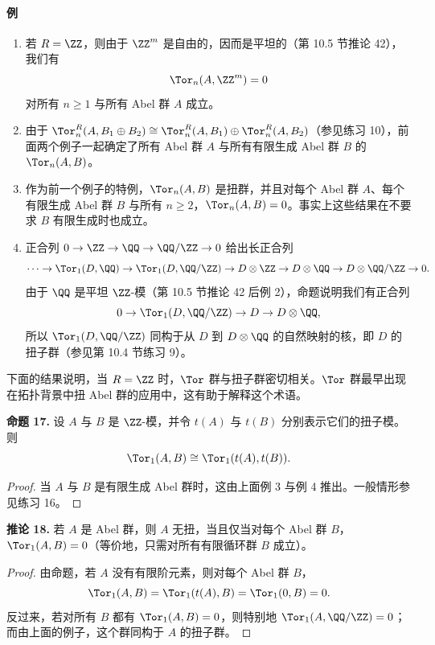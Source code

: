 \paragraph{例}
\begin{enumerate}[label=(\arabic*)]
  \item 若 $R=\ZZ$，则由于 $\ZZ^m$ 是自由的，因而是平坦的（第 10.5 节推论 42），我们有
  \[
    \Tor_n(A,\ZZ^m)=0
  \]
  对所有 $n\geq1$ 与所有 Abel 群 $A$ 成立。
  \item 由于 $\Tor_n^R(A,B_1\oplus B_2)\cong\Tor_n^R(A,B_1)\oplus\Tor_n^R(A,B_2)$（参见练习 10），前面两个例子一起确定了所有 Abel 群 $A$ 与所有有限生成 Abel 群 $B$ 的 $\Tor_n(A,B)$。
  \item 作为前一个例子的特例，$\Tor_n(A,B)$ 是扭群，并且对每个 Abel 群 $A$、每个有限生成 Abel 群 $B$ 与所有 $n\geq2$，$\Tor_n(A,B)=0$。事实上这些结果在不要求 $B$ 有限生成时也成立。
  \item 正合列 $0\to\ZZ\to\QQ\to\QQ/\ZZ\to0$ 给出长正合列
  \[
    \cdots\to\Tor_1(D,\QQ)\to\Tor_1(D,\QQ/\ZZ)\to D\otimes\ZZ\to D\otimes\QQ\to D\otimes\QQ/\ZZ\to0.
  \]
  由于 $\QQ$ 是平坦 $\ZZ$-模（第 10.5 节推论 42 后例 2），命题说明我们有正合列
  \[
    0\to\Tor_1(D,\QQ/\ZZ)\to D\to D\otimes\QQ,
  \]
  所以 $\Tor_1(D,\QQ/\ZZ)$ 同构于从 $D$ 到 $D\otimes\QQ$ 的自然映射的核，即 $D$ 的扭子群（参见第 10.4 节练习 9）。
\end{enumerate}

下面的结果说明，当 $R=\ZZ$ 时，$\Tor$ 群与扭子群密切相关。$\Tor$ 群最早出现在拓扑背景中扭 Abel 群的应用中，这有助于解释这个术语。

\medskip
\noindent\textbf{命题 17.} 设 $A$ 与 $B$ 是 $\ZZ$-模，并令 $t(A)$ 与 $t(B)$ 分别表示它们的扭子模。则
\[
  \Tor_1(A,B)\cong\Tor_1(t(A),t(B)).
\]

\begin{proof}
当 $A$ 与 $B$ 是有限生成 Abel 群时，这由上面例 3 与例 4 推出。一般情形参见练习 16。
\end{proof}

\medskip
\noindent\textbf{推论 18.} 若 $A$ 是 Abel 群，则 $A$ 无扭，当且仅当对每个 Abel 群 $B$，$\Tor_1(A,B)=0$（等价地，只需对所有有限循环群 $B$ 成立）。


\begin{proof}
由命题，若 $A$ 没有有限阶元素，则对每个 Abel 群 $B$，
\[
  \Tor_1(A,B)=\Tor_1(t(A),B)=\Tor_1(0,B)=0.
\]
反过来，若对所有 $B$ 都有 $\Tor_1(A,B)=0$，则特别地 $\Tor_1(A,\QQ/\ZZ)=0$；而由上面的例子，这个群同构于 $A$ 的扭子群。
\end{proof}

